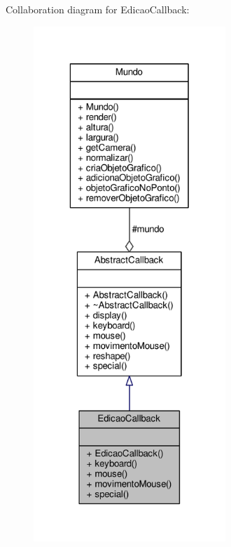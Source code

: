 Collaboration diagram for Edicao\+Callback\+:
\nopagebreak
\begin{figure}[H]
\begin{center}
\leavevmode
\includegraphics[height=550pt]{classEdicaoCallback__coll__graph}
\end{center}
\end{figure}
